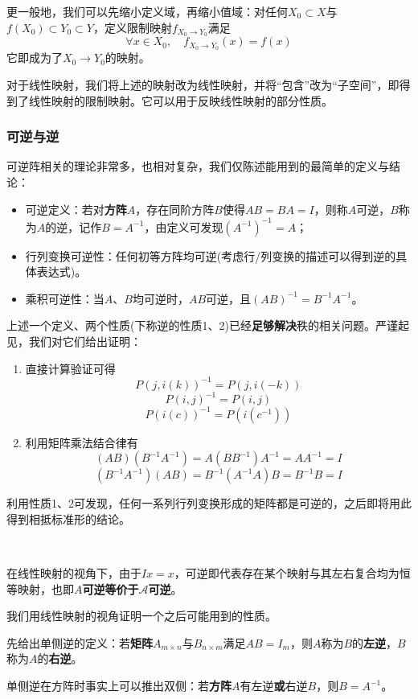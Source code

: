 \documentclass[a4paper,UTF8,fontset=windows]{ctexart}
\newcommand*{\ma}{\mathcal{A}}
\begin{document}
更一般地，我们可以先缩小定义域，再缩小值域：对任何$X_0\subset X$与$f(X_0)\subset Y_0\subset Y$，定义限制映射$f_{X_0\to Y_0}$满足
$$\forall x\in X_0,\quad f_{X_0\to Y_0}(x)=f(x)$$
它即成为了$X_0\to Y_0$的映射。

对于线性映射，我们将上述的映射改为线性映射，并将``包含''改为``子空间''，即得到了线性映射的限制映射。它可以用于反映线性映射的部分性质。

\subsubsection{可逆与逆}
可逆阵相关的理论非常多，也相对复杂，我们仅陈述能用到的最简单的定义与结论：
\begin{itemize}
    \item 可逆定义：若对\textbf{方阵}$A$，存在同阶方阵$B$使得$AB=BA=I$，则称$A$可逆，$B$称为$A$的逆，记作$B=A^{-1}$，由定义可发现$(A^{-1})^{-1}=A$；
    \item 行列变换可逆性：任何初等方阵均可逆(考虑行/列变换的描述可以得到逆的具体表达式)。
    \item 乘积可逆性：当$A$、$B$均可逆时，$AB$可逆，且$(AB)^{-1}=B^{-1}A^{-1}$。
\end{itemize}

上述一个定义、两个性质(下称逆的性质1、2)已经\textbf{足够解决}秩的相关问题。严谨起见，我们对它们给出证明：
\begin{enumerate}
    \item 直接计算验证可得
    $$P(j,i(k))^{-1}=P(j,i(-k))$$
    $$P(i,j)^{-1}=P(i,j)$$
    $$P(i(c))^{-1}=P(i(c^{-1}))$$
    \item 利用矩阵乘法结合律有
    $$(AB)(B^{-1}A^{-1})=A(BB^{-1})A^{-1}=AA^{-1}=I$$
    $$(B^{-1}A^{-1})(AB)=B^{-1}(A^{-1}A)B=B^{-1}B=I$$
\end{enumerate}

利用性质1、2可发现，任何一系列行列变换形成的矩阵都是可逆的，之后即将用此得到相抵标准形的结论。

\

在线性映射的视角下，由于$Ix=x$，可逆即代表存在某个映射与其左右复合均为恒等映射，也即\textbf{$A$可逆等价于$\ma$可逆}。

我们用线性映射的视角证明一个之后可能用到的性质。

先给出单侧逆的定义：若\textbf{矩阵}$A_{m\times n}$与$B_{n\times m}$满足$AB=I_m$，则$A$称为$B$的\textbf{左逆}，$B$称为$A$的\textbf{右逆}。

单侧逆在方阵时事实上可以推出双侧：若\textbf{方阵}$A$有左逆\textbf{或}右逆$B$，则$B=A^{-1}$。
\end{document}
